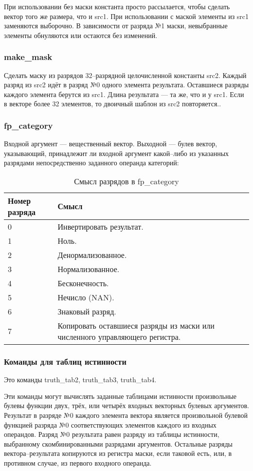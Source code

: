 \documentclass[forwardcom.tex]{subfiles}
\begin{document}
При использовании без маски константа просто рассылается, чтобы сделать вектор того же размера, что и src1. При использовании с маской элементы из src1 заменяются выборочно. В зависимости от разряда №1 маски, невыбранные элементы обнуляются или остаются без изменений.

\subsubsection{make\_mask}
Сделать маску из разрядов 32--разрядной целочисленной константы src2. Каждый разряд из src2 идёт в разряд №0 одного элемента результата. Оставшиеся разряды каждого элемента берутся из src1. Длина результата --- та же, что и у src1. Если в векторе более 32 элементов, то двоичный шаблон из src2 повторяется..

\subsubsection{fp\_category}
Входной аргумент --- вещественный вектор. Выходной --- булев вектор, указывающий, принадлежит ли входной аргумент какой--либо из указанных разрядами непосредственно заданного операнда категорий:

\begin{longtable} {|l|p{90mm}|}
\caption{Смысл разрядов в fp\_category} 
\label{table:fpCategoryInstructionBits} \\
\endfirsthead
\endhead
\hline
\bfseries Номер разряда & \bfseries Смысл  \\ \hline
0 & Инвертировать результат. \\
1 & Ноль. \\
2 & Денормализованное.  \\
3 & Нормализованное. \\
4 & Бесконечность.  \\
5 & Нечисло (NAN). \\
6 & Знаковый разряд.  \\
7 & Копировать оставшиеся разряды из маски или численного управляющего регистра.  \\ \hline
\end{longtable}

\subsubsection{Команды для таблиц истинности} \label{truthTableFunctions}
Это команды truth\_tab2, truth\_tab3, truth\_tab4.

Эти команды могут вычислять заданные таблицами истинности произвольные булевы функции двух, трёх, или четырёх входных векторных булевых аргументов. Результат в разряде №0 каждого элемента вектора является произвольной булевой функцией разряда №0 соответствующих элементов каждого из входных операндов. Разряд №0 результата равен разряду из таблицы истинности, выбранному скомбинированными разрядами аргументов. Остальные разряды вектора--результата копируются из регистра маски, если таковой есть, или, в противном случае, из первого входного операнда. 
\end{document}
